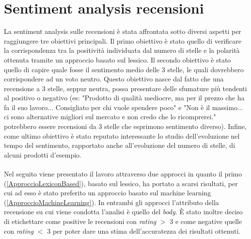 \section{Sentiment analysis recensioni}\label{SentimentAnalysis}
La sentiment analysis sulle recensioni è stata affrontata sotto diversi aspetti per raggiungere tre obiettivi principali. Il primo obiettivo è stato quello di verificare la corrispondenza tra la positività individuata dal numero di stelle e la polarità ottenuta tramite un approccio basato sul lessico. Il secondo obiettivo è stato quello di capire quale fosse il sentimento medio delle 3 stelle, le quali dovrebbero corrispondere ad un voto neutro. Questo obiettivo nasce dal fatto che una recensione a 3 stelle, seppur neutra, possa presentare delle sfumature più tendenti al positivo o negativo (es: "Prodotto di qualità mediocre, ma per il prezzo che ha fa il suo lavoro... Consigliato per chi vuole spendere poco" e "Non è il massimo... ci sono alternative migliori sul mercato e non credo che lo ricomprerei." potrebbero essere recensioni da 3 stelle che esprimono sentimento diverso). Infine, come ultimo obiettivo è stato reputato interessante lo studio dell'evoluzione nel tempo del sentimento, rapportato anche all'evoluzione del numero di stelle, di alcuni prodotti d'esempio. 
\\\\
Nel seguito viene presentato il lavoro attraverso due approcci in quanto il primo (\ref{ApproccioLexiconBased}), basato sul lessico, ha portato a scarsi risultati, per cui ad esso è stato preferito un approccio basato sul machine learning (\ref{ApproccioMachineLearning}).
In entrambi gli approcci l'attributo della recensione su cui viene condotta l'analisi è quello del \textit{body}. È stato inoltre deciso di etichettare come positive le recensioni con \textit{rating} $>$ 3 e come negative quelle con \textit{rating} $<$ 3 per poter dare una stima dell'accuratezza dei risultati ottenuti.


